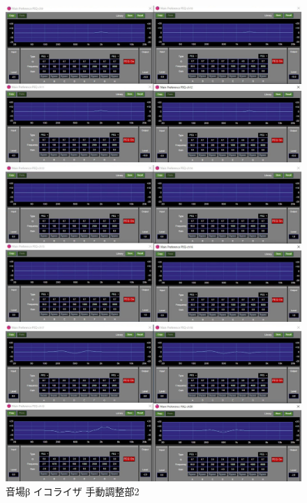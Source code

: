 \documentclass[11pt,a4j]{jreport}
\begin{document}
\begin{figure}[H]
  \begin{minipage}[b]{.5\linewidth}
    \centering
    \includegraphics[width=.9\linewidth]{images/experimentField/afcParameters/02beta/05manualEQ8.jpg}
  \end{minipage}%
  \begin{minipage}[b]{.5\linewidth}
    \centering
    \includegraphics[width=.9\linewidth]{images/experimentField/afcParameters/02beta/05manualEQ9.jpg}
  \end{minipage}

  \begin{minipage}[b]{1\linewidth}
    \centering
    \includegraphics[width=.45\linewidth]{images/experimentField/afcParameters/02beta/05manualEQ10.jpg}
  \end{minipage}

  \centering
  \caption{音場β イコライザ 手動調整部2}
  \label{fig:betaイコライザ手動調整部2}
\end{figure}
\newpage
\end{document}
